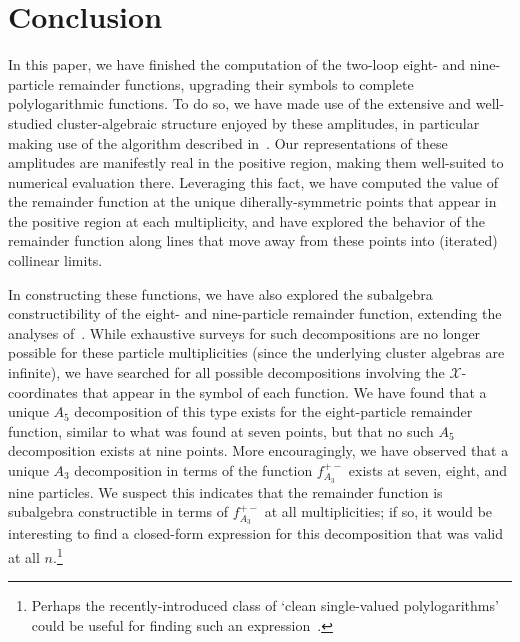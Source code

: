 \documentclass[11pt]{article}
\def\x{\mathcal{X}}
\begin{document}
\section{Conclusion}

In this paper, we have finished the computation of the two-loop eight- and nine-particle remainder functions, upgrading their symbols to complete polylogarithmic functions. To do so, we have made use of the extensive and well-studied cluster-algebraic structure enjoyed by these amplitudes, in particular making use of the algorithm described in~\cite{Golden:2014xqf}. Our representations of these amplitudes are manifestly real in the positive region, making them well-suited to numerical evaluation there. Leveraging this fact, we have computed the value of the remainder function at the unique diherally-symmetric points that appear in the positive region at each multiplicity, and have explored the behavior of the remainder function along lines that move away from these points into (iterated) collinear limits.

In constructing these functions, we have also explored the subalgebra constructibility of the eight- and nine-particle remainder function, extending the analyses of~\cite{Golden:2014xqa,Golden:2018gtk}. While exhaustive surveys for such decompositions are no longer possible for these particle multiplicities (since the underlying cluster algebras are infinite), we have searched for all possible decompositions involving the $\x$-coordinates that appear in the symbol of each function. We have found that a unique $A_5$ decomposition of this type exists for the eight-particle remainder function, similar to what was found at seven points, but that no such $A_5$ decomposition exists at nine points. More encouragingly, we have observed that a unique $A_3$ decomposition in terms of the function $f_{A_3}^{+-}$ exists at seven, eight, and nine particles. We suspect this indicates that the remainder function is subalgebra constructible in terms of $f_{A_3}^{+-}$ at all multiplicities; if so, it would be interesting to find a closed-form expression for this decomposition that was valid at all $n$.\footnote{Perhaps the recently-introduced class of `clean single-valued polylogarithms' could be useful for finding such an expression~\cite{Charlton:2021uhu}.}
\end{document}
